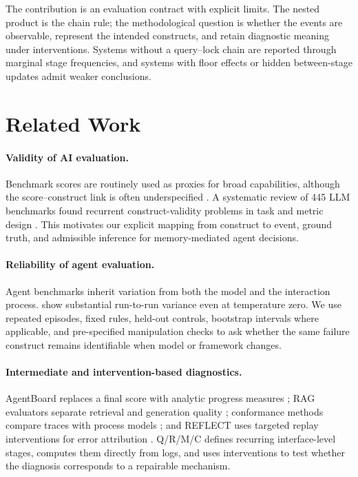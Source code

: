 \documentclass{article}
\newcommand{\qrmc}{Q/R/M/C}
\begin{document}
The contribution is an evaluation contract with explicit limits. The nested product is the chain rule; the methodological question is whether the events are observable, represent the intended constructs, and retain diagnostic meaning under interventions. Systems without a query--lock chain are reported through marginal stage frequencies, and systems with floor effects or hidden between-stage updates admit weaker conclusions.

\section{Related Work}

\paragraph{Validity of AI evaluation.}
Benchmark scores are routinely used as proxies for broad capabilities, although the score--construct link is often underspecified \citep{raji2021everything}. A systematic review of 445 LLM benchmarks found recurrent construct-validity problems in task and metric design \citep{bean2025construct}. This motivates our explicit mapping from construct to event, ground truth, and admissible inference for memory-mediated agent decisions.

\paragraph{Reliability of agent evaluation.}
Agent benchmarks inherit variation from both the model and the interaction process. \citet{bjarnason2026randomness} show substantial run-to-run variance even at temperature zero. We use repeated episodes, fixed rules, held-out controls, bootstrap intervals where applicable, and pre-specified manipulation checks to ask whether the same failure construct remains identifiable when model or framework changes.

\paragraph{Intermediate and intervention-based diagnostics.}
AgentBoard replaces a final score with analytic progress measures \citep{ma2024agentboard}; RAG evaluators separate retrieval and generation quality \citep{es2024ragas,ru2024ragchecker}; conformance methods compare traces with process models \citep{vanderaalst2016process,carmona2018conformance}; and REFLECT uses targeted replay interventions for error attribution \citep{lin2026reflect}. \qrmc{} defines recurring interface-level stages, computes them directly from logs, and uses interventions to test whether the diagnosis corresponds to a repairable mechanism.
\end{document}
